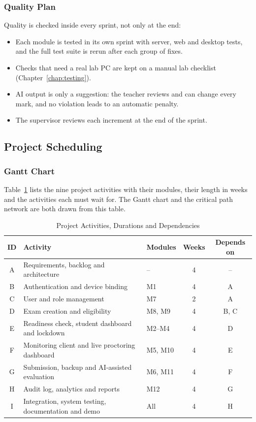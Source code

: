\subsubsection{Quality Plan}

Quality is checked inside every sprint, not only at the end:
\begin{itemize}[nosep]
    \item Each module is tested in its own sprint with server, web and desktop tests, and the full test suite is rerun after each group of fixes.
    \item Checks that need a real lab PC are kept on a manual lab checklist (Chapter~\ref{chap:testing}).
    \item AI output is only a suggestion: the teacher reviews and can change every mark, and no violation leads to an automatic penalty.
    \item The supervisor reviews each increment at the end of the sprint.
\end{itemize}

\subsection{Project Scheduling}
\label{sec:scheduling}

\subsubsection{Gantt Chart}

Table~\ref{tab:cpm} lists the nine project activities with their modules, their length in weeks and the activities each must wait for. The Gantt chart and the critical path network are both drawn from this table.

\begin{table}[!htbp]
\centering
\caption{Project Activities, Durations and Dependencies}
\label{tab:cpm}
\renewcommand{\arraystretch}{1.2}
\begin{tabular}{c>{\raggedright\arraybackslash}p{7.2cm}lcc}
\hline\hline
\textbf{ID} & \textbf{Activity} & \textbf{Modules} & \textbf{Weeks} & \textbf{Depends on} \\
\hline
A & Requirements, backlog and architecture & -- & 4 & -- \\
B & Authentication and device binding & M1 & 4 & A \\
C & User and role management & M7 & 2 & A \\
D & Exam creation and eligibility & M8, M9 & 4 & B, C \\
E & Readiness check, student dashboard and lockdown & M2--M4 & 4 & D \\
F & Monitoring client and live proctoring dashboard & M5, M10 & 4 & E \\
G & Submission, backup and AI-assisted evaluation & M6, M11 & 4 & F \\
H & Audit log, analytics and reports & M12 & 4 & G \\
I & Integration, system testing, documentation and demo & All & 4 & H \\
\hline\hline
\end{tabular}
\end{table}

